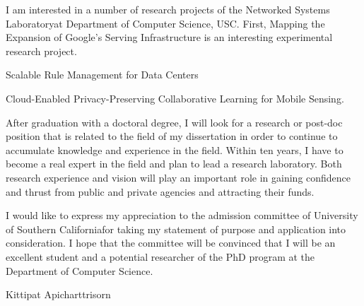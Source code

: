 \documentclass[a4paper]{report}
\newcommand{\university}{University of Southern California}
\newcommand{\department}{Department of Computer Science}
\newcommand{\uniabbre}{USC}
\newcommand{\labfirst}{Networked Systems Laboratory}
\begin{document}
\vspace{0.2cm}
I am interested in a number of research projects of the \labfirst \space at \department, \uniabbre. First, Mapping the Expansion of Google's Serving Infrastructure is an interesting experimental research project.

\vspace{0.2cm}
Scalable Rule Management for Data Centers

\vspace{0.2cm}
Cloud-Enabled Privacy-Preserving Collaborative Learning for Mobile Sensing.

\vspace{0.2cm}
After graduation with a doctoral degree, I will look for a research or post-doc position that is related to the field of my dissertation in order to continue to accumulate knowledge and experience in the field. Within ten years, I have to become a real expert in the field and plan to lead a research laboratory. Both research experience and vision will play an important role in gaining confidence and thrust from public and private agencies and attracting their funds.

\vspace{0.2cm}
I would like to express my appreciation to the admission committee of \university \space for taking my statement of purpose and application into consideration. I hope that the committee will be convinced that I will be an excellent student and a potential researcher of the PhD program at the \department.

\vspace{1cm}
\raggedleft Kittipat Apicharttrisorn
\end{document}
